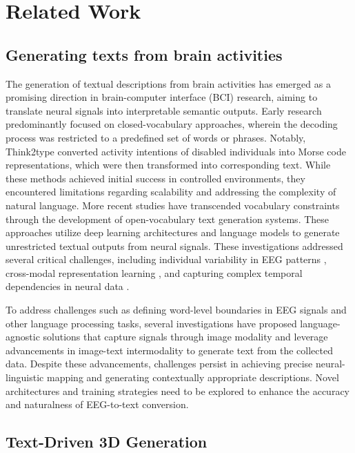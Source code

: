 \documentclass[sigconf]{acmart}
\begin{document}
\section{Related Work}
\subsection{Generating texts from brain activities}

The generation of textual descriptions from brain activities has emerged as a promising direction in brain-computer interface (BCI) research, aiming to translate neural signals into interpretable semantic outputs. Early research \cite{biswal2019eegtotext,srivastava2020think2type,liu2024eeg2text} predominantly focused on closed-vocabulary approaches, wherein the decoding process was restricted to a predefined set of words or phrases. Notably, Think2type \cite{srivastava2020think2type} converted activity intentions of disabled individuals into Morse code representations, which were then transformed into corresponding text. While these methods achieved initial success in controlled environments, they encountered limitations regarding scalability and addressing the complexity of natural language. More recent studies \cite{feng2023aligning,amrani2024deep,tao2025see,chen2025decoding} have transcended vocabulary constraints through the development of open-vocabulary text generation systems. These approaches utilize deep learning architectures and language models to generate unrestricted textual outputs from neural signals. These investigations addressed several critical challenges, including individual variability in EEG patterns \cite{amrani2024deep}, cross-modal representation learning \cite{tao2025see}, and capturing complex temporal dependencies in neural data \cite{chen2025decoding}.

To address challenges such as defining word-level boundaries in EEG signals and other language processing tasks, several investigations \cite{mishra2024thought2text,ikegawa2024text} have proposed language-agnostic solutions that capture signals through image modality and leverage advancements in image-text intermodality to generate text from the collected data. Despite these advancements, challenges persist in achieving precise neural-linguistic mapping and generating contextually appropriate descriptions. Novel architectures and training strategies need to be explored to enhance the accuracy and naturalness of EEG-to-text conversion.

\subsection{Text-Driven 3D Generation}
\end{document}

